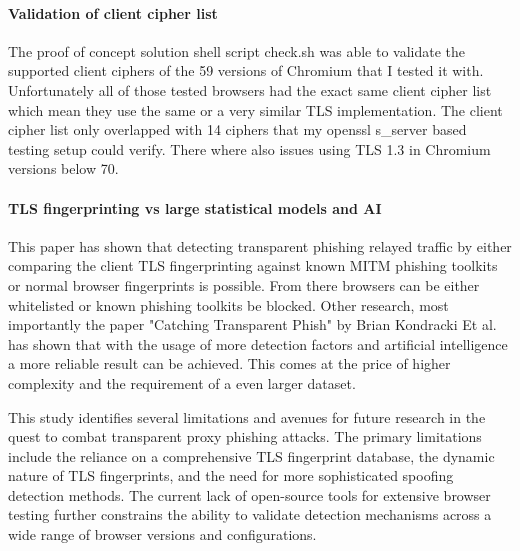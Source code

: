 \documentclass[12pt]{scrbook}
\begin{document}
\paragraph{Validation of client cipher list}
The proof of concept solution shell script check.sh was able to validate the
supported client ciphers of the 59 versions of Chromium that I tested it with.
Unfortunately all of those tested browsers had the exact same client cipher list
which mean they use the same or a very similar TLS implementation. The client cipher list only
overlapped with 14 ciphers that my openssl s\_server based testing setup could
verify. There where also issues using TLS 1.3 in Chromium versions below 70.

\paragraph{TLS fingerprinting vs large statistical models and AI}
This paper has shown that detecting transparent phishing relayed traffic by either
comparing the client TLS fingerprinting against known MITM phishing toolkits or normal browser fingerprints is possible.
From there browsers can be either whitelisted or known phishing toolkits be blocked.
Other research, most importantly the paper "Catching Transparent Phish" by Brian Kondracki Et al. has shown
that with the usage of more detection factors and artificial intelligence a more reliable result can be achieved.
This comes at the price of higher complexity and the requirement of a even larger dataset.

This study identifies several limitations and avenues for future research in the quest to combat transparent proxy phishing attacks. The primary limitations include the reliance on a comprehensive TLS fingerprint database, the dynamic nature of TLS fingerprints, and the need for more sophisticated spoofing detection methods. The current lack of open-source tools for extensive browser testing further constrains the ability to validate detection mechanisms across a wide range of browser versions and configurations.

\newpage  
\end{document}
